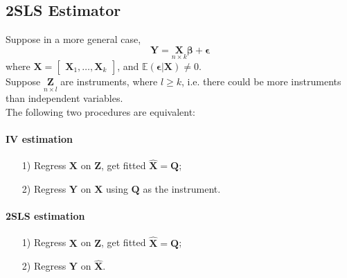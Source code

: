 \documentclass[%
 aip,
 jmp,%
 amsmath,amssymb,
 reprint,%
]{revtex4-1}
\def\b{\beta}
\def\e{\epsilon}
\def\E{\mathbb{E}}
\def\h{\hat}
\newcommand{\mat}[1]{\bm{#1}}
\renewcommand{\vec}[1]{\bm{#1}}
\begin{document}
\subsection{2SLS Estimator}
Suppose in a more general case,
$$ \vec Y = \underset{n\times k}{\mat X}\vec\b + \vec\e $$
where $\mat X = \begin{bmatrix}\vec X_1, \dots, \vec X_k\end{bmatrix}$, and $\E(\vec\e|\mat X)\neq 0$.\\

Suppose $\underset{n\times l}{\mat Z}$ are instruments, where $l \ge k$, i.e. there could be more instruments than independent variables.\\

The following two procedures are equivalent:
\paragraph{IV estimation}
\begin{enumerate}
  \item[1)] Regress $\mat X$ on $\mat Z$, get fitted $\mat{\h X} = \mat Q$;
  \item[2)] Regress $\vec Y$ on $\mat X$ using $\mat Q$ as the instrument.
\end{enumerate}
\paragraph{2SLS estimation}
\begin{enumerate}
  \item[1)] Regress $\mat X$ on $\mat Z$, get fitted $\mat{\h X} = \mat Q$;
  \item[2)] Regress $\vec Y$ on $\mat{\h X}$.
\end{enumerate}
\end{document}

